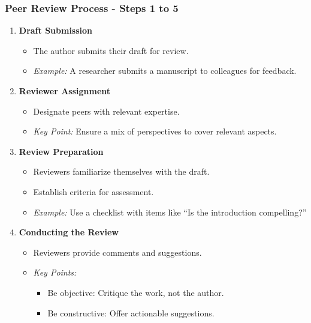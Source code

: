 \documentclass{beamer}
\begin{document}
\begin{frame}[fragile]
    \frametitle{Peer Review Process - Steps 1 to 5}
    \begin{enumerate}
        \item \textbf{Draft Submission}
            \begin{itemize}
                \item The author submits their draft for review.
                \item \textit{Example:} A researcher submits a manuscript to colleagues for feedback.
            \end{itemize}

        \item \textbf{Reviewer Assignment}
            \begin{itemize}
                \item Designate peers with relevant expertise.
                \item \textit{Key Point:} Ensure a mix of perspectives to cover relevant aspects.
            \end{itemize}

        \item \textbf{Review Preparation}
            \begin{itemize}
                \item Reviewers familiarize themselves with the draft.
                \item Establish criteria for assessment.
                \item \textit{Example:} Use a checklist with items like “Is the introduction compelling?”
            \end{itemize}

        \item \textbf{Conducting the Review}
            \begin{itemize}
                \item Reviewers provide comments and suggestions.
                \item \textit{Key Points:} 
                    \begin{itemize}
                        \item Be objective: Critique the work, not the author.
                        \item Be constructive: Offer actionable suggestions.
                    \end{itemize}
            \end{itemize}


\end{enumerate}
\end{frame}
\end{document}
